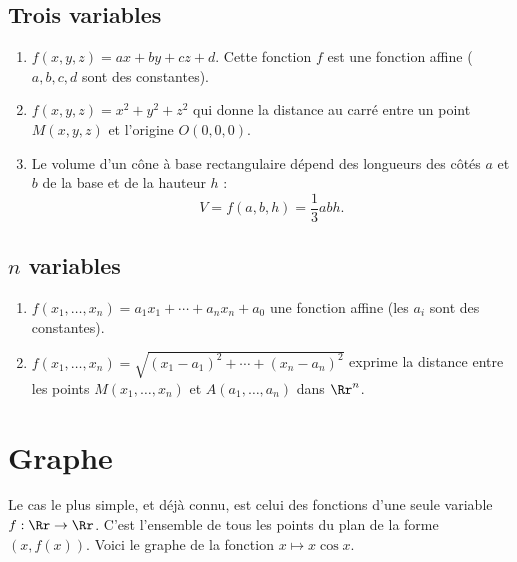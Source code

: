 \documentclass[11pt,class=report,crop=false]{standalone}
\begin{document}
\subsection{Trois variables}

\begin{exemple}
\sauteligne
\begin{enumerate}
  \item $f(x,y,z) = ax+by+cz+d$. Cette fonction $f$ est une fonction affine ($a,b,c,d$ sont des constantes).
   \item $f(x,y,z) = x^2+y^2+z^2$ qui donne la distance au carré entre un point $M(x,y,z)$ et l'origine $O(0,0,0)$.
   \item Le volume d'un cône à base rectangulaire dépend des longueurs des côtés $a$ et $b$ de la base et de la hauteur $h$ :
   $$V = f(a,b,h) = \frac13 abh.$$
   
     
\end{enumerate}
\end{exemple}


\subsection{$n$ variables}

\begin{exemple}
\sauteligne
\begin{enumerate}
  \item $f(x_1,\ldots,x_n) = a_1x_1+\cdots+a_nx_n+a_0$ une fonction affine (les $a_i$ sont des constantes).
  \item $f(x_1,\ldots,x_n) = \sqrt{(x_1-a_1)^2+\cdots+(x_n-a_n)^2}$ exprime la distance entre les points $M(x_1,\ldots,x_n)$ et $A(a_1,\ldots,a_n)$ dans $\Rr^n$.
\end{enumerate}
\end{exemple}


\section{Graphe}

Le cas le plus simple, et déjà connu, est celui des fonctions d'une seule variable $f : \Rr \rightarrow \Rr$.  C'est l'ensemble de tous les points du plan de la forme $(x,f(x))$. Voici le graphe de la fonction $x \mapsto x\cos x$.
\end{document}
